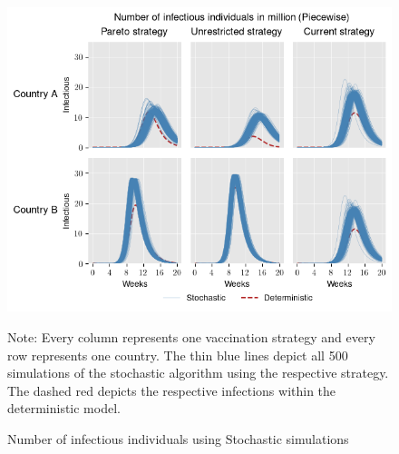 \begin{figure}[h!]
\centering
\includegraphics[scale=0.85]{images/splines_stochastic_infectious.png}\\
\begin{flushleft}
\scriptsize{Note:} Every column represents one vaccination strategy and every row represents one country. The thin blue lines depict all 500 simulations of the stochastic algorithm using the respective strategy. The dashed red depicts the respective infections within the deterministic model. 
\end{flushleft}
\caption{Number of infectious individuals using Stochastic simulations}
\label{fig:results_splines_infectious_dead_stochastic}
\end{figure}















